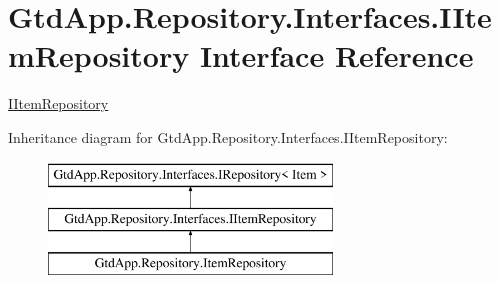 \hypertarget{interface_gtd_app_1_1_repository_1_1_interfaces_1_1_i_item_repository}{}\section{Gtd\+App.\+Repository.\+Interfaces.\+I\+Item\+Repository Interface Reference}
\label{interface_gtd_app_1_1_repository_1_1_interfaces_1_1_i_item_repository}


\mbox{\hyperlink{interface_gtd_app_1_1_repository_1_1_interfaces_1_1_i_item_repository}{I\+Item\+Repository}}  


Inheritance diagram for Gtd\+App.\+Repository.\+Interfaces.\+I\+Item\+Repository\+:\begin{figure}[H]
\begin{center}
\leavevmode
\includegraphics[height=3.000000cm]{interface_gtd_app_1_1_repository_1_1_interfaces_1_1_i_item_repository}
\end{center}
\end{figure}
